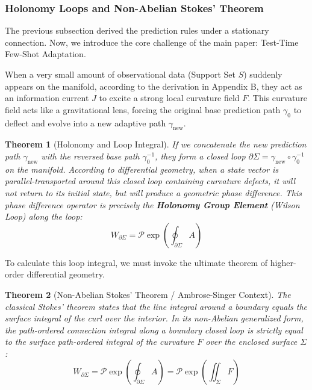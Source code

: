 \documentclass{article}
\newtheorem{theorem}{Theorem}[section]
\begin{document}
\subsubsection{Holonomy Loops and Non-Abelian Stokes' Theorem}

The previous subsection derived the prediction rules under a stationary connection. Now, we introduce the core challenge of the main paper: Test-Time Few-Shot Adaptation.

When a very small amount of observational data (Support Set $S$) suddenly appears on the manifold, according to the derivation in Appendix B, they act as an information current $J$ to excite a strong local curvature field $F$. This curvature field acts like a gravitational lens, forcing the original base prediction path $\gamma_0$ to deflect and evolve into a new adaptive path $\gamma_{\text{new}}$.

\begin{theorem}[Holonomy and Loop Integral]
If we concatenate the new prediction path $\gamma_{\text{new}}$ with the reversed base path $\gamma_0^{-1}$, they form a closed loop $\partial\Sigma = \gamma_{\text{new}} \circ \gamma_0^{-1}$ on the manifold. According to differential geometry, when a state vector is parallel-transported around this closed loop containing curvature defects, it will not return to its initial state, but will produce a geometric phase difference. This phase difference operator is precisely the \textbf{Holonomy Group Element} (Wilson Loop) along the loop:
\begin{equation}
W_{\partial\Sigma} = \mathcal{P}\exp \left( \oint_{\partial\Sigma} A \right)
\end{equation}
\end{theorem}

To calculate this loop integral, we must invoke the ultimate theorem of higher-order differential geometry.

\begin{theorem}[Non-Abelian Stokes' Theorem / Ambrose-Singer Context]
The classical Stokes' theorem states that the line integral around a boundary equals the surface integral of the curl over the interior. In its non-Abelian generalized form, the path-ordered connection integral along a boundary closed loop is strictly equal to the surface path-ordered integral of the curvature $F$ over the enclosed surface $\Sigma$:
\begin{equation}
W_{\partial\Sigma} = \mathcal{P}\exp \left( \oint_{\partial\Sigma} A \right) = \mathcal{P}\exp \left( \iint_\Sigma F \right)
\end{equation}
\end{theorem}
\end{document}
